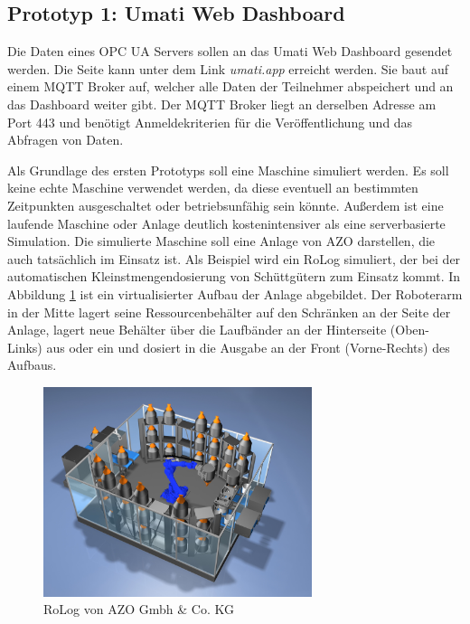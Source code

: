 \documentclass[a4paper, 12pt, oneside, toc=listofnumbered, bibliography=totoc]{scrbook}
\begin{document}
		\subsection{Prototyp 1: Umati Web Dashboard}
		
		Die Daten eines OPC UA Servers sollen an das Umati Web Dashboard gesendet werden. Die Seite kann unter dem Link \textit{umati.app} erreicht werden. Sie baut auf einem MQTT Broker auf, welcher alle Daten der Teilnehmer abspeichert und an das Dashboard weiter gibt. Der MQTT Broker liegt an derselben Adresse am Port 443 und benötigt Anmeldekriterien für die Veröffentlichung und das Abfragen von Daten.
		
		Als Grundlage des ersten Prototyps soll eine Maschine simuliert werden. Es soll keine echte Maschine verwendet werden, da diese eventuell an bestimmten Zeitpunkten ausgeschaltet oder betriebsunfähig sein könnte. Außerdem ist eine laufende Maschine oder Anlage deutlich kostenintensiver als eine serverbasierte Simulation. Die simulierte Maschine soll eine Anlage von AZO darstellen, die auch tatsächlich im Einsatz ist. Als Beispiel wird ein RoLog simuliert, der bei der automatischen Kleinstmengendosierung von Schüttgütern zum Einsatz kommt. In Abbildung \ref{fig:RoLog} ist ein virtualisierter Aufbau der Anlage abgebildet. Der Roboterarm in der Mitte lagert seine Ressourcenbehälter auf den Schränken an der Seite der Anlage, lagert neue Behälter über die Laufbänder an der Hinterseite (Oben-Links) aus oder ein und dosiert in die Ausgabe an der Front (Vorne-Rechts) des Aufbaus. \cite{noauthor_azo_nodate}
		
		\begin{figure}[H]
			\centering
			\includegraphics[width=0.7\textwidth]{res/RoLog.png}
			\caption{RoLog von AZO Gmbh \& Co. KG \cite{noauthor_azo_nodate}}
			\label{fig:RoLog}
		\end{figure}
	
\end{document}

